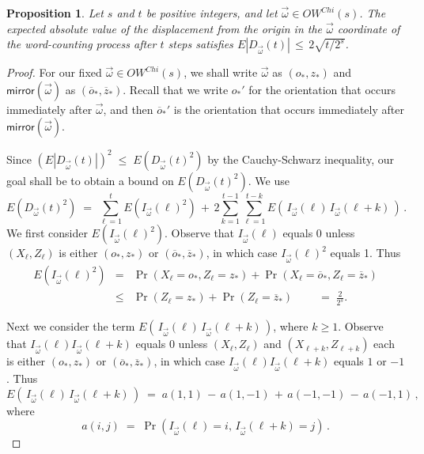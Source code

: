 \documentclass[12pt]{amsart}
\newtheorem{proposition}[theorem]{Proposition}
\theoremstyle{definition}
\theoremstyle{remark}
\numberwithin{equation}{section}
\newcommand{\mirror}{\textsf{mirror}}
\begin{document}
\begin{proposition}
   \label{prop.Jbound}
Let $s$ and $t$ be positive integers, and let $\vec{\omega}\in OW^{Chi}(s)$. The expected absolute value of the displacement from the origin in the $\vec{\omega}$ coordinate of the word-counting process after $t$ steps satisfies 
$E| D_{\vec{\omega}}(t)|   \,\leq \,  2\sqrt{t/2^s}$.   
\end{proposition}
\begin{proof}
For our fixed $\vec{\omega}\in OW^{Chi}(s)$, we shall write
 $\vec{\omega}$ as $(o_*,z_*)$ and 
 $\mirror(\vec{\omega})$ as $(\overline{o}_*,\overline{z}_*)$.  
Recall that we write $o_*'$ for the orientation that occurs immediately after $\vec{\omega}$, and then $\overline{o}_*'$ is the orientation that occurs immediately after $\mirror(\vec{\omega})$.

Since $\left(E|D_{\vec{\omega}}(t)|\right)^2 \;\leq \;  E(D_{\vec{\omega}}(t)^2)$ by the Cauchy-Schwarz inequality, our goal shall be to obtain a bound on $E(D_{\vec{\omega}}(t)^2)$.  We use 
\begin{equation}
   \label{eq.JsumI}
     E(D_{\vec{\omega}}(t)^2)  \;=\;  \sum_{\ell=1}^t E(I_{\vec{\omega}}(\ell)^2)  \,+\,  2 \sum_{k=1}^{t-1} \sum_{\ell=1}^{t-k}  E( \,I_{\vec{\omega}}(\ell)\,I_{\vec{\omega}}(\ell+k)\, ) \,.
\end{equation}
We first consider $E(I_{\vec{\omega}}(\ell)^2)$.  Observe that $I_{\vec{\omega}}(\ell)$ equals 0 unless $(X_\ell,Z_\ell)$ is either $(o_*,z_*)$ or $(\overline{o}_*,\overline{z}_*)$, in which 
case $I_{\vec{\omega}}(\ell)^2$ equals 1.
Thus
\begin{eqnarray} 
    \nonumber
    E(I_{\vec{\omega}}(\ell)^2)  &=&  \Pr(X_\ell=o_*,Z_\ell=z_*)+\Pr(X_\ell=\overline{o}_*,Z_\ell=\overline{z}_*)   \\
    \label{eq.I2bound}
  & \leq &    \Pr(Z_\ell=z_*)+\Pr(Z_\ell=\overline{z}_*) \qquad\;=\;  \frac{2}{2^{s}}.
\end{eqnarray}


Next  we consider the term $ E( \,I_{\vec{\omega}}(\ell)\,I_{\vec{\omega}}(\ell+k)\, )$, where $k\geq 1$.
Observe that $I_{\vec{\omega}}(\ell)I_{\vec{\omega}}(\ell+k)$ equals 0 unless $(X_\ell,Z_\ell)$ and $(X_{\ell+k},Z_{\ell+k})$ each is either $(o_*,z_*)$ or $(\overline{o}_*,\overline{z}_*)$, in which 
case $I_{\vec{\omega}}(\ell)I_{\vec{\omega}}(\ell+k)$ equals $1$ or $-1$.
Thus 
\begin{equation}
    \label{eq.Eaaaa}
     E(\,I_{\vec{\omega}}(\ell)\,I_{\vec{\omega}}(\ell+k)\, )   \;=\;  a(1,1) \,-\,a(1,-1) \,+\,a(-1,-1)\,-\,a(-1,1) \,,
\end{equation}
where
\[    a(i,j)   \;=\;  \Pr(I_{\vec{\omega}}(\ell)=i, \,I_{\vec{\omega}}(\ell+k)=j)\,.
\]


\end{proof}
\end{document}

